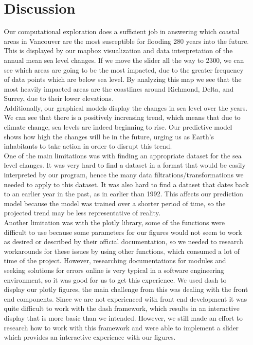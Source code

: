 \documentclass[fontsize=11pt]{article}
\begin{document}
    \section*{Discussion}
    \hspace{\parindent}Our computational exploration does a sufficient job in answering which coastal areas in Vancouver are the most susceptible for flooding 280 years into the future. This is displayed by our mapbox visualization and data interpretation of the annual mean sea level changes. If we move the slider all the way to 2300, we can see which areas are going to be the most impacted, due to the greater frequency of data points which are below sea level. By analyzing this map we see that the most heavily impacted areas are the coastlines around Richmond, Delta, and Surrey, due to their lower elevations. \\

    Additionally, our graphical models display the changes in sea level over the years. We can see that there is a positively increasing trend, which means that due to climate change, sea levels are indeed beginning to rise. Our predictive model shows how high the changes will be in the future, urging us as Earth’s inhabitants to take action in order to disrupt this trend. \\

    One of the main limitations was with finding an appropriate dataset for the sea level changes. It was very hard to find a dataset in a format that would be easily interpreted by our program, hence the many data filtrations/transformations we needed to apply to this dataset. It was also hard to find a dataset that dates back to an earlier year in the past, as in earlier than 1992. This affects our prediction model because the model was trained over a shorter period of time, so the projected trend may be less representative of reality. \\

    Another limitation was with the plotly library, some of the functions were difficult to use because some parameters for our figures would not seem to work as desired or described by their official documentation, so we needed to research workarounds for these issues by using other functions, which consumed a lot of time of the project. However, researching documentations for modules and seeking solutions for errors online is very typical in a software engineering environment, so it was good for us to get this experience. We used dash to display our plotly figures, the main challenge from this was dealing with the front end components. Since we are not experienced with front end development it was quite difficult to work with the dash framework, which results in an interactive display that is more basic than we intended. However, we still made an effort to research how to work with this framework and were able to implement a slider which provides an interactive experience with our figures. \\
\end{document}
